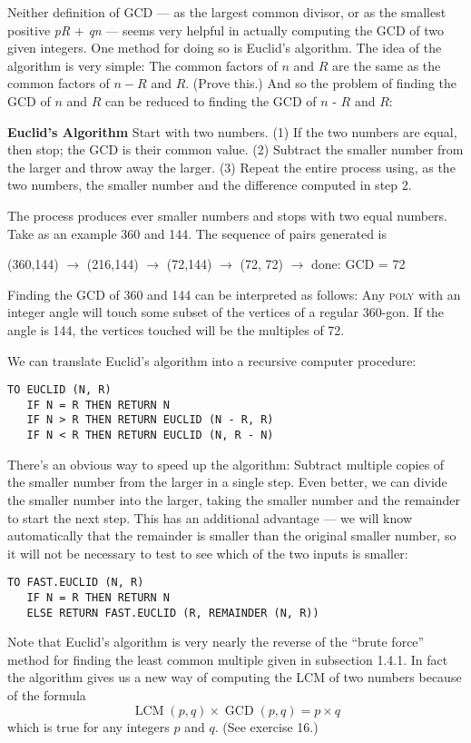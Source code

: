 \documentclass{book}
\begin{document}
Neither definition of GCD --- as the largest common divisor, or as the
smallest positive {\em pR} + {\em qn} --- seems very helpful in actually computing
the GCD of two given integers. One method for doing so is Euclid's
algorithm. The idea of the algorithm is very simple: The common factors
of $n$ and $R$ are the same as the common factors of $n - R$ and $R$. (Prove
this.) And so the problem of finding the GCD of $n$ and $R$ can be reduced
to finding the GCD of $n$ - $R$ and $R$:

\vspace{0.5cm}

\noindent \textbf{Euclid's Algorithm} Start with two numbers. (1) If the two numbers are equal, then stop; the GCD is their common value. (2) Subtract the
smaller number from the larger and throw away the larger. (3) Repeat
the entire process using, as the two numbers, the smaller number and the difference computed in step 2.

\vspace{0.5cm}

The process produces ever smaller numbers and stops with two equal
numbers. Take as an example 360 and 144. The sequence of pairs
generated is

(360,144) $\rightarrow$ (216,144) $\rightarrow$ (72,144) $\rightarrow$ (72, 72) $\rightarrow$ done: GCD = 72

Finding the GCD of 360 and 144 can be interpreted as follows: Any \textsc{poly}
with an integer angle will touch some subset of the vertices of a regular
360-gon. If the angle is 144, the vertices touched will be the multiples
of 72.

We can translate Euclid's algorithm into a recursive computer procedure:

\begin{verbatim}
TO EUCLID (N, R)
   IF N = R THEN RETURN N
   IF N > R THEN RETURN EUCLID (N - R, R)
   IF N < R THEN RETURN EUCLID (N, R - N)
\end{verbatim}
There's an obvious way to speed up the algorithm: Subtract multiple
copies of the smaller number from the larger in a single step. Even better,
we can divide the smaller number into the larger, taking the smaller
number and the remainder to start the next step. This has an additional
advantage --- we will know automatically that the remainder is smaller
than the original smaller number, so it will not be necessary to test to
see which of the two inputs is smaller:

\begin{verbatim}
TO FAST.EUCLID (N, R)
   IF N = R THEN RETURN N
   ELSE RETURN FAST.EUCLID (R, REMAINDER (N, R))
\end{verbatim}
Note that Euclid's algorithm is very nearly the reverse of the ``brute
force'' method for finding the least common multiple given in subsection
1.4.1. In fact the algorithm gives us a new way of computing the LCM
of two numbers because of the formula
$$\operatorname{LCM}(p, q) \times \operatorname{GCD}(p, q) = p \times q$$
which is true for any integers $p$ and $q$. (See exercise 16.)
\end{document}
